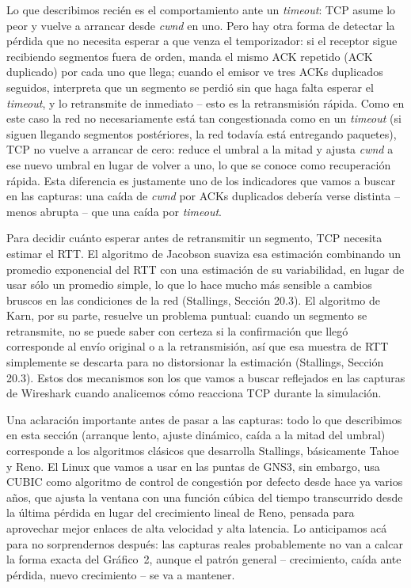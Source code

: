 \documentclass[11pt,a4paper]{article}
\begin{document}
Lo que describimos reci\'en es el comportamiento ante un \textit{timeout}: TCP asume lo peor y vuelve a arrancar desde \textit{cwnd} en uno. Pero hay otra forma de detectar la p\'erdida que no necesita esperar a que venza el temporizador: si el receptor sigue recibiendo segmentos fuera de orden, manda el mismo ACK repetido (ACK duplicado) por cada uno que llega; cuando el emisor ve tres ACKs duplicados seguidos, interpreta que un segmento se perdi\'o sin que haga falta esperar el \textit{timeout}, y lo retransmite de inmediato -- esto es la retransmisi\'on r\'apida. Como en este caso la red no necesariamente est\'a tan congestionada como en un \textit{timeout} (si siguen llegando segmentos post\'eriores, la red todav\'ia est\'a entregando paquetes), TCP no vuelve a arrancar de cero: reduce el umbral a la mitad y ajusta \textit{cwnd} a ese nuevo umbral en lugar de volver a uno, lo que se conoce como recuperaci\'on r\'apida. Esta diferencia es justamente uno de los indicadores que vamos a buscar en las capturas: una ca\'ida de \textit{cwnd} por ACKs duplicados deber\'ia verse distinta -- menos abrupta -- que una ca\'ida por \textit{timeout}.

Para decidir cu\'anto esperar antes de retransmitir un segmento, TCP necesita estimar el RTT. El algoritmo de Jacobson suaviza esa estimaci\'on combinando un promedio exponencial del RTT con una estimaci\'on de su variabilidad, en lugar de usar s\'olo un promedio simple, lo que lo hace mucho m\'as sensible a cambios bruscos en las condiciones de la red (Stallings, Secci\'on 20.3). El algoritmo de Karn, por su parte, resuelve un problema puntual: cuando un segmento se retransmite, no se puede saber con certeza si la confirmaci\'on que lleg\'o corresponde al env\'io original o a la retransmisi\'on, as\'i que esa muestra de RTT simplemente se descarta para no distorsionar la estimaci\'on (Stallings, Secci\'on 20.3). Estos dos mecanismos son los que vamos a buscar reflejados en las capturas de Wireshark cuando analicemos c\'omo reacciona TCP durante la simulaci\'on.

Una aclaraci\'on importante antes de pasar a las capturas: todo lo que describimos en esta secci\'on (arranque lento, ajuste din\'amico, ca\'ida a la mitad del umbral) corresponde a los algoritmos cl\'asicos que desarrolla Stallings, b\'asicamente Tahoe y Reno. El Linux que vamos a usar en las puntas de GNS3, sin embargo, usa CUBIC como algoritmo de control de congesti\'on por defecto desde hace ya varios a\~nos, que ajusta la ventana con una funci\'on c\'ubica del tiempo transcurrido desde la \'ultima p\'erdida en lugar del crecimiento lineal de Reno, pensada para aprovechar mejor enlaces de alta velocidad y alta latencia. Lo anticipamos ac\'a para no sorprendernos despu\'es: las capturas reales probablemente no van a calcar la forma exacta del Gr\'afico~2, aunque el patr\'on general -- crecimiento, ca\'ida ante p\'erdida, nuevo crecimiento -- se va a mantener.
\end{document}
